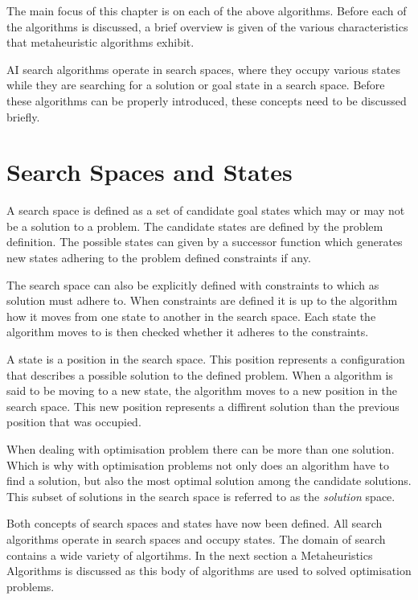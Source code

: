 The main focus of this chapter is on each of the above algorithms. Before each of the algorithms is discussed, a brief overview is given of the various characteristics that metaheuristic algorithms exhibit. 

AI search algorithms operate in search spaces, where they occupy various states while they are searching for a solution or goal state in a search space. Before these algorithms can be properly introduced, these concepts need to be discussed briefly.

\section{Search Spaces and States}
A search space is defined as a set of candidate goal states which may or may not be a solution to a problem\cite{AIModernApproach}. The candidate states are defined by the problem definition\cite{AIModernApproach}. The possible states can given by a successor function which generates new states adhering to the problem defined constraints if any\cite{AIModernApproach}. 

The search space can also be explicitly defined with constraints to which as solution must adhere to\cite{AIModernApproach}. When constraints are defined it is up to the algorithm how it moves from one state to another in the search space\cite{AIModernApproach}. Each state the algorithm moves to is then checked whether it adheres to the constraints\cite{AIModernApproach}.

A state is a position in the search space\cite{AIModernApproach}. This position represents a configuration that describes a possible solution to the defined problem\cite{AIModernApproach}. When a algorithm is said to be moving to a new state, the algorithm moves to a new position in the search space\cite{AIModernApproach}. This new position represents a diffirent solution than the previous position that was occupied\cite{AIModernApproach}.

When dealing with optimisation problem there can be more than one solution\cite{AIModernApproach}. Which is why with optimisation problems not only does an algorithm have to find a solution, but also the most optimal solution among the candidate solutions\cite{AIModernApproach}. This subset of solutions in the search space is referred to as the \emph{solution} space.

Both concepts of search spaces and states have now been defined. All search algorithms operate in search spaces and occupy states. The domain of search contains a wide variety of algortihms. In the next section a Metaheuristics Algorithms is discussed as this body of algorithms are used to solved optimisation problems.

